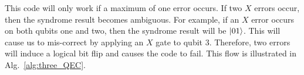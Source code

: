 This code will only work if a maximum of one error occurs. If two $X$ errors occur, then the syndrome result becomes ambiguous. For example, if an $X$ error occurs on both qubits one and two, then the syndrome result will be $|01\rangle$. This will cause us to mis-correct by applying an $X$ gate to qubit 3. Therefore, two errors will induce a logical bit flip and causes the code to fail. This flow is illustrated in Alg.~\ref{alg:three_QEC}.



